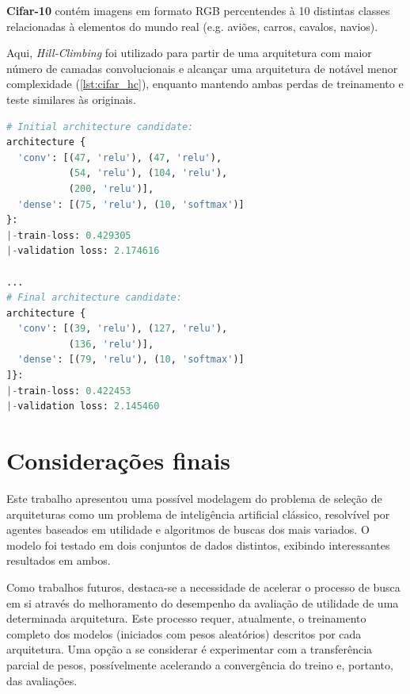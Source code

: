 \documentclass[twoside,conference,a4paper,12px]{IEEEtran}
\begin{document}
\textbf{Cifar-10} contém imagens em formato RGB percentendes à 10 distintas classes relacionadas à elementos do mundo real (e.g. aviões, carros, cavalos, navios).

Aqui, \textit{Hill-Climbing} foi utilizado para partir de uma arquitetura com maior número de camadas convolucionais e alcançar uma arquitetura de notável menor complexidade (\ref{lst:cifar_hc}), enquanto mantendo ambas perdas de treinamento e teste similares às originais.

\begin{lstlisting}[language=Python, caption={Resultado da busca por \textit{Hill-Climbing} sobre o conjunto de dados \textbf{Cifar-10}.}, label={lst:cifar_hc}]
# Initial architecture candidate:
architecture {
  'conv': [(47, 'relu'), (47, 'relu'),
           (54, 'relu'), (104, 'relu'),
           (200, 'relu')],
  'dense': [(75, 'relu'), (10, 'softmax')]
}:
|-train-loss: 0.429305
|-validation loss: 2.174616

...
# Final architecture candidate:
architecture {
  'conv': [(39, 'relu'), (127, 'relu'),
           (136, 'relu')],
  'dense': [(79, 'relu'), (10, 'softmax')]
]}:
|-train-loss: 0.422453
|-validation loss: 2.145460
\end{lstlisting}


\section{Considerações finais}
\label{sec:consideracoes_finais}

Este trabalho apresentou uma possível modelagem do problema de seleção de arquiteturas como um problema de inteligência artificial clássico, resolvível por agentes baseados em utilidade e algoritmos de buscas dos mais variados. O modelo foi testado em dois conjuntos de dados distintos, exibindo interessantes resultados em ambos.

Como trabalhos futuros, destaca-se a necessidade de acelerar o processo de busca em si através do melhoramento do desempenho da avaliação de utilidade de uma determinada arquitetura. Este processo requer, atualmente, o treinamento completo dos modelos (iniciados com pesos aleatórios) descritos por cada arquitetura. Uma opção a se considerar é experimentar com a transferência parcial de pesos, possívelmente acelerando a convergência do treino e, portanto, das avaliações.
\end{document}
